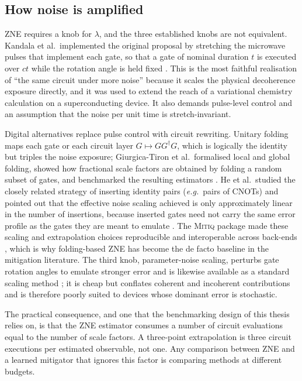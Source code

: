 \documentclass[Thesis.tex]{subfiles}
\begin{document}
\subsection{How noise is amplified}\label{sec:ch2_noise_amplification}

ZNE requires a knob for $\lambda$, and the three established knobs are not
equivalent. Kandala et al.\ implemented the original proposal by stretching
the microwave pulses that implement each gate, so that a gate of nominal
duration $t$ is executed over $ct$ while the rotation angle is held fixed
\cite{kandala2019extends}. This is the most faithful realisation of
``the same circuit under more noise'' because it scales the physical
decoherence exposure directly, and it was used to extend the reach of a
variational chemistry calculation on a superconducting device. It also demands
pulse-level control and an assumption that the noise per unit time is
stretch-invariant.

Digital alternatives replace pulse control with circuit rewriting.
Unitary folding maps each gate or each circuit layer $G \mapsto G G^{\dagger}
G$, which is logically the identity but triples the noise exposure;
Giurgica-Tiron et al.\ formalised local and global folding, showed how
fractional scale factors are obtained by folding a random subset of gates, and
benchmarked the resulting estimators \cite{giurgicatiron2020digital}. He et
al.\ studied the closely related strategy of inserting identity pairs
(\textit{e.g.}\ pairs of CNOTs) and pointed out that the effective noise
scaling achieved is only approximately linear in the number of insertions,
because inserted gates need not carry the same error profile as the gates they
are meant to emulate \cite{he2020zero}. The \textsc{Mitiq} package made these
scaling and extrapolation choices reproducible and interoperable across
back-ends \cite{larose2022mitiq}, which is why folding-based ZNE has become the
de facto baseline in the mitigation literature. The third knob, parameter-noise
scaling, perturbs gate rotation angles to emulate stronger error and is
likewise available as a standard scaling method \cite{larose2022mitiq}; it is
cheap but conflates coherent and incoherent contributions and is therefore
poorly suited to devices whose dominant error is stochastic.

The practical consequence, and one that the benchmarking design of this thesis
relies on, is that the ZNE estimator consumes a number of circuit evaluations
equal to the number of scale factors. A three-point extrapolation is three
circuit executions per estimated observable, not one. Any comparison between
ZNE and a learned mitigator that ignores this factor is comparing methods at
different budgets.
\end{document}

